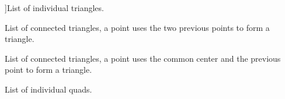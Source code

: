 \begin{Desc}
\begin{description}
{}]List of individual triangles. \item[{\em 
\hypertarget{group__graphics_gga5ee56ac1339984909610713096283b1ba66643dbbb24bbacb405973ed80eebae0}{Triangles\+Strip}\label{group__graphics_gga5ee56ac1339984909610713096283b1ba66643dbbb24bbacb405973ed80eebae0}
}]List of connected triangles, a point uses the two previous points to form a triangle. \item[{\em 
\hypertarget{group__graphics_gga5ee56ac1339984909610713096283b1ba5338a2c6d922151fe50f235036af8a20}{Triangles\+Fan}\label{group__graphics_gga5ee56ac1339984909610713096283b1ba5338a2c6d922151fe50f235036af8a20}
}]List of connected triangles, a point uses the common center and the previous point to form a triangle. \item[{\em 
\hypertarget{group__graphics_gga5ee56ac1339984909610713096283b1ba5041359b76b4bd3d3e6ef738826b8743}{Quads}\label{group__graphics_gga5ee56ac1339984909610713096283b1ba5041359b76b4bd3d3e6ef738826b8743}
}]List of individual quads. \end{description}
\end{Desc}

